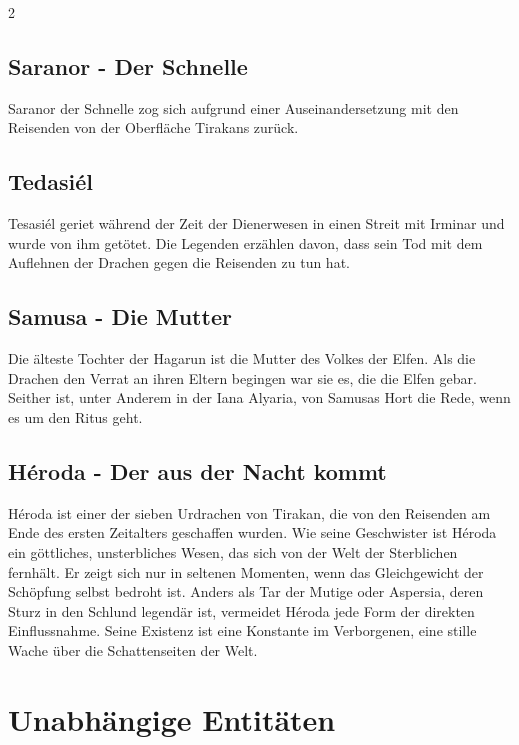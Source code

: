 \begin{multicols}{2}
{\subsection{Saranor - Der Schnelle}\label{subsec:saranor-der-schnelle}

Saranor der Schnelle zog sich aufgrund einer Auseinandersetzung mit den Reisenden von der Oberfläche Tirakans zurück.

\subsection{Tedasiél}\label{subsec:tedasiel}

Tesasiél geriet während der Zeit der Dienerwesen in einen Streit mit Irminar und wurde von ihm getötet.
Die Legenden erzählen davon, dass sein Tod mit dem Auflehnen der Drachen gegen die Reisenden zu tun hat.

\subsection{Samusa - Die Mutter}\label{subsec:samusa-die-mutter}

Die älteste Tochter der Hagarun ist die Mutter des Volkes der Elfen.
Als die Drachen den Verrat an ihren Eltern begingen war sie es, die die Elfen gebar.
Seither ist, unter Anderem in der Iana Alyaria, von Samusas Hort die Rede, wenn es um den Ritus geht.

\subsection{Héroda - Der aus der Nacht kommt}\label{subsec:heroda-der-aus-der-nacht-kommt}

Héroda ist einer der sieben Urdrachen von Tirakan, die von den Reisenden am Ende des ersten Zeitalters geschaffen wurden.
Wie seine Geschwister ist Héroda ein göttliches, unsterbliches Wesen, das sich von der Welt der Sterblichen fernhält.
Er zeigt sich nur in seltenen Momenten, wenn das Gleichgewicht der Schöpfung selbst bedroht ist.
Anders als Tar der Mutige oder Aspersia, deren Sturz in den Schlund legendär ist, vermeidet Héroda jede Form der direkten Einflussnahme.
Seine Existenz ist eine Konstante im Verborgenen, eine stille Wache über die Schattenseiten der Welt.


\section{Unabhängige Entitäten}\label{sec:unabhangige-entitaten}

}
\end{multicols}
